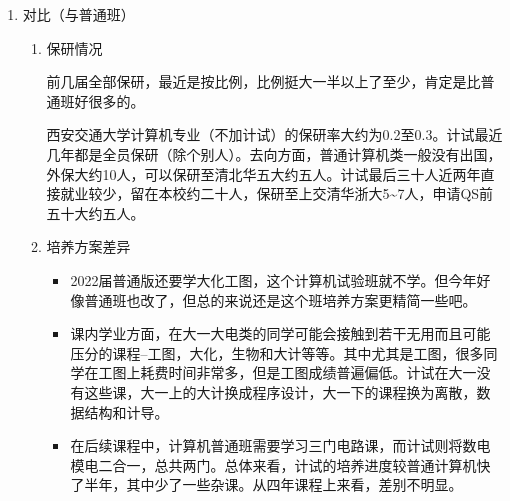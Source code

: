 \documentclass[zihao=-4,fontset=none]{Beautybook-CN}
\begin{document}
\begin{enumerate}
	\item 对比（与普通班）
	      	      
	      \begin{enumerate}
	      	\item 保研情况
	      	      	      	      
	      	      前几届全部保研，最近是按比例，比例挺大一半以上了至少，肯定是比普通班好很多的。
	      	      	      	      
	      	      西安交通大学计算机专业（不加计试）的保研率大约为0.2至0.3。计试最近几年都是全员保研（除个别人）。去向方面，普通计算机类一般没有出国，外保大约10人，可以保研至清北华五大约五人。计试最后三十人近两年直接就业较少，留在本校约二十人，保研至上交清华浙大5\textasciitilde{}7人，申请QS前五十大约五人。
	      	      	      	      
	      	\item 培养方案差异
	      	      	\begin{itemize}
	      	      	    \item 2022届普通版还要学大化工图，这个计算机试验班就不学。但今年好像普通班也改了，但总的来说还是这个班培养方案更精简一些吧。
	      	      	      	      
	      	      \item 课内学业方面，在大一大电类的同学可能会接触到若干无用而且可能压分的课程--工图，大化，生物和大计等等。其中尤其是工图，很多同学在工图上耗费时间非常多，但是工图成绩普遍偏低。计试在大一没有这些课，大一上的大计换成程序设计，大一下的课程换为离散，数据结构和计导。
	      	      	      	      
	      	      \item 在后续课程中，计算机普通班需要学习三门电路课，而计试则将数电模电二合一，总共两门。总体来看，计试的培养进度较普通计算机快了半年，其中少了一些杂课。从四年课程上来看，差别不明显。
	      	      	\end{itemize}      	      
	      	      
	      \end{enumerate}
\end{enumerate}
\end{document}
